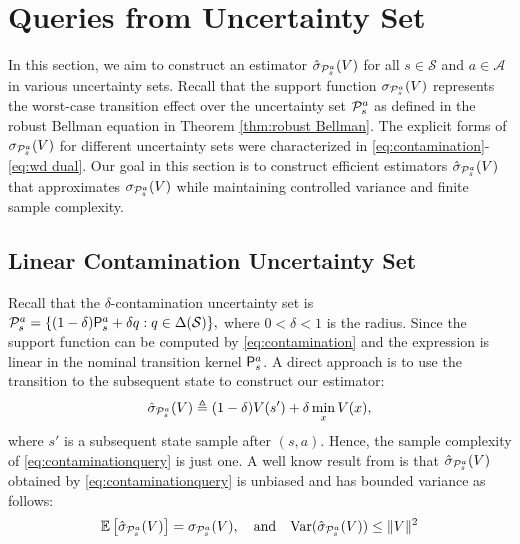 \section{Queries from Uncertainty Set} \label{QueriesSection}
In this section, we aim to construct an estimator $\hat{\sigma}_{\mathcal{P}^a_s}(V)$ for all $s \in \mathcal{S}$ and $a \in \mathcal{A}$ in various uncertainty sets. Recall that the support function ${\sigma}_{\mathcal{P}^a_s}(V)$ represents the worst-case transition effect over the uncertainty set $\mathcal{P}^a_s$ as defined in the robust Bellman equation in Theorem \ref{thm:robust Bellman}. The explicit forms of ${\sigma}_{\mathcal{P}^a_s}(V)$ for different uncertainty sets were characterized in \eqref{eq:contamination}-\eqref{eq:wd dual}. Our goal in this section is to construct efficient estimators $\hat{\sigma}_{\mathcal{P}^a_s}(V)$ that approximates ${\sigma}_{\mathcal{P}^a_s}(V)$ while maintaining controlled variance and finite sample complexity.

\subsection{Linear Contamination Uncertainty Set}
Recall that the $\delta$-contamination uncertainty set is
$
    \mathcal{P}^a_s=\{(1-\delta)\mathsf P^a_s+\delta q: q\in\Delta(\mathcal{S}) \}, 
$
where $0<\delta<1$ is the radius. Since the support function can be computed by \eqref{eq:contamination} and the expression is linear in the nominal transition kernel $\mathsf P^a_s$. A direct approach is to use the transition to the subsequent state to construct our estimator:
\begin{align}\label{eq:contaminationquery}
    \hat{\sigma}_{\mathcal{P}^a_s}(V)\triangleq (1-\delta) V(s')+\delta\min_x V(x),
\end{align}
where $s'$ is a subsequent state sample after $(s,a)$. Hence, the sample complexity of \eqref{eq:contaminationquery} is just one. A well know result from \citep{wang2023model} is that $\hat{\sigma}_{\mathcal{P}^a_s}(V)$ obtained by \eqref{eq:contaminationquery} is unbiased and has bounded variance as follows:
\begin{equation}
        \mathbb{E}\left[\hat{\sigma}_{\mathcal{P}^a_s}(V)\right] = {\sigma}_{\mathcal{P}^a_s}(V), \quad \text{and} \quad \mathrm{Var}(\hat{\sigma}_{\mathcal{P}^a_s}(V)) \leq  \|V\|^2
\end{equation}



